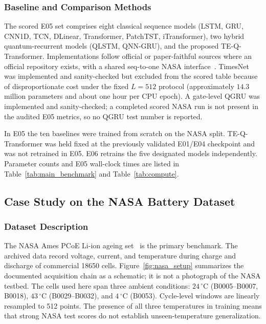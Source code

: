 \subsubsection{Baseline and Comparison Methods}
\label{sec:baseline_comparison}

The scored E05 set comprises eight classical sequence models (LSTM, GRU, CNN1D, TCN, DLinear, Transformer, PatchTST, iTransformer), two hybrid quantum-recurrent models (QLSTM, QNN-GRU), and the proposed TE-Q-Transformer. Implementations follow official or paper-faithful sources where an official repository exists, with a shared seq-to-one NASA interface~\citep{wang2024state,zhang2023accurate,giuliano2025transformer,soon2025hybrid,wang2026prediction}. TimesNet was implemented and sanity-checked but excluded from the scored table because of disproportionate cost under the fixed $L=512$ protocol (approximately $14.3$ million parameters and about one hour per CPU epoch). A gate-level QGRU was implemented and sanity-checked; a completed scored NASA run is not present in the audited E05 metrics, so no QGRU test number is reported.

In E05 the ten baselines were trained from scratch on the NASA split. TE-Q-Transformer was held fixed at the previously validated E01/E04 checkpoint and was not retrained in E05. E06 retrains the five designated models independently. Parameter counts and E05 wall-clock times are listed in Table~\ref{tab:main_benchmark} and Table~\ref{tab:compute}.

\subsection{Case Study on the NASA Battery Dataset}
\label{sec:nasa_case}

\subsubsection{Dataset Description}
\label{sec:nasa_description}

The NASA Ames PCoE Li-ion ageing set~\cite{saha2007battery} is the primary benchmark. The archived data record voltage, current, and temperature during charge and discharge of commercial 18650 cells. Figure~\ref{fig:nasa_setup} summarizes the documented acquisition chain as a schematic; it is not a photograph of the NASA testbed. The cells used here span three ambient conditions: $24\,^\circ$C (B0005--B0007, B0018), $43\,^\circ$C (B0029--B0032), and $4\,^\circ$C (B0053). Cycle-level windows are linearly resampled to 512 points. The presence of all three temperatures in training means that strong NASA test scores do not establish unseen-temperature generalization.

